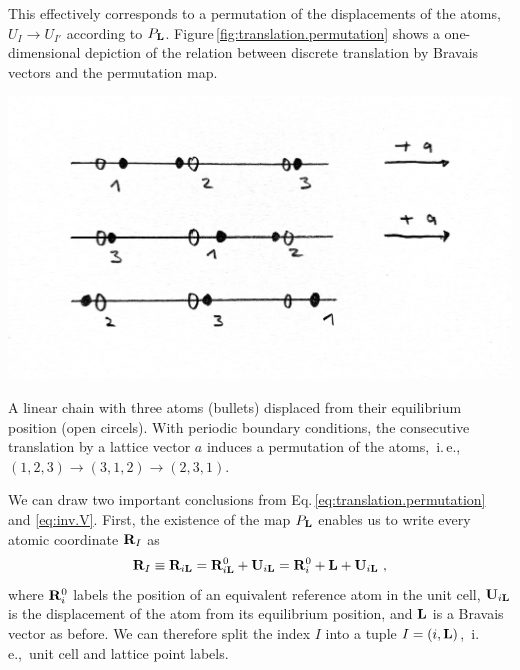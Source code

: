 This effectively corresponds to a permutation of the displacements of the atoms, $U_I \to U_{I'}$ according to $P_{\bf L}$. Figure\,\ref{fig:translation.permutation} shows a one-dimensional depiction of the relation between discrete translation by Bravais vectors and the permutation map.
\begin{marginfigure}
	\centering
	\includegraphics[width=\textwidth]{./data/sketches/permutation1.jpg}
	\caption{A linear chain with three atoms (bullets) displaced from their equilibrium position (open circels). With periodic boundary conditions, the consecutive translation by a lattice vector $a$ induces a permutation of the atoms,~i.\,e.,~$(1, 2 , 3) \to (3, 1, 2) \to (2, 3, 1)$.}
	\label{fig:translation.permutation}
\end{marginfigure}

We can draw two important conclusions from Eq.\,\eqref{eq:translation.permutation} and \eqref{eq:inv.V}. First, the existence of the map $P_{\bf L}$ enables us to write every atomic coordinate ${\bf R}_I$ as
\begin{align}
	{\bf R}_I \equiv {\bf R}_{i {\bf L}} 
		= {\bf R}^0_{i \b L} + {\bf U}_{i {\bf L}}
		= {\bf R}^0_i + {\bf L} + {\bf U}_{i {\bf L}}~,
	\label{eq:R_iL}
\end{align}
where ${\bf R}^0_i$ labels the position of an equivalent reference atom in the unit cell, ${\bf U}_{i {\bf L}}$ is the displacement of the atom from its equilibrium position, and $\bf L$ is a Bravais vector as before.
We can therefore split the index $I$ into a tuple $I = (i, {\bf L})$,~i.\,e.,~unit cell and lattice point labels.

